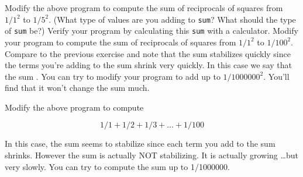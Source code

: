 \begin{ex}
Modify the above program to compute the sum of reciprocals of squares from $1/1^{2}$ to $1/5^{2}$. (What type of values are you adding to \texttt{sum}? What should the type of \texttt{sum} be?) Verify your program by calculating this \texttt{sum} with a calculator. Modify your program to compute the sum of reciprocals of squares from $1/1^{2}$ to $1/100^{2}$. Compare to the previous exercise and note that the sum stabilizes quickly since the terms you're adding to the sum shrink very quickly. In this case we say that the sum . You can try to modify your program to add up to $1/1000000^{2}$. You'll find that it won't change the sum much.
\end{ex}

\begin{ex}
Modify the above program to compute

\[1/1 + 1/2 + 1/3 + \ldots + 1/100\]

In this case, the sum seems to stabilize since each term you add to the
sum shrinks. However the sum is actually NOT stabilizing. It is actually
growing \ldots but very slowly. You can try to compute the sum up to
1/1000000.
\end{ex}

